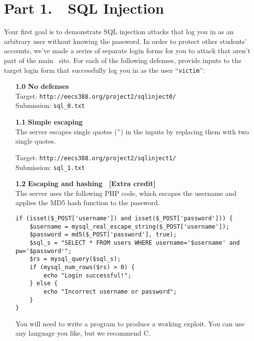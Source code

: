 \documentclass[letterpaper,12pt]{article}
\begin{document}
{\newpage

\section*{Part 1.\ \ SQL Injection}

Your first goal is to demonstrate SQL injection attacks that log you in as an arbitrary user without knowing the password.  In order to protect other students' accounts, we've made a series of separate login forms for you to attack that aren't part of the main \bungle\ site.  For each of the following defenses, provide inputs to the target login form that successfully log you in as the user ``\texttt{victim}'':

\begin{enumerate}
\item[\bf 1.0] \textbf{No defenses}\\
Target: \texttt{{http://eecs388.org/project2/sqlinject0/}}\\
Submission: \texttt{{sql\_0.txt}}


\item[\bf 1.1] \textbf{Simple escaping}\\
The server escapes single quotes (\texttt{'}) in the inputs by replacing them with two single quotes.
\smallskip

Target: \texttt{{http://eecs388.org/project2/sqlinject1/}}\\
Submission: {\texttt{sql\_1.txt}}


\item[\bf 1.2] \textbf{Escaping and hashing \ [Extra credit]}\\
The server uses the following PHP code, which escapes the username and applies the MD5 hash function to the password.
{\vspace{-6pt}\small\begin{verbatim}
if (isset($_POST['username']) and isset($_POST['password'])) {
    $username = mysql_real_escape_string($_POST['username']);
    $password = md5($_POST['password'], true);
    $sql_s = "SELECT * FROM users WHERE username='$username' and pw='$password'";
    $rs = mysql_query($sql_s);
    if (mysql_num_rows($rs) > 0) {
        echo "Login successful!";
    } else {
        echo "Incorrect username or password";
    }
}
\end{verbatim}}
\vspace{-6pt}
You will need to write a program to produce a working exploit.  You can use any language you like, but we recommend C.
\smallskip


\end{enumerate}}
\end{document}
